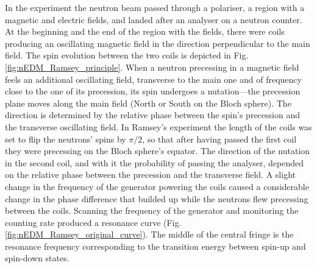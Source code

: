 In the experiment the neutron beam passed through a polariser, a region with a magnetic and electric fields, and landed after an analyser on a neutron counter. At the beginning and the end of the region with the fields, there were coils producing an oscillating magnetic field in the direction perpendicular to the main field. The spin evolution between the two coils is depicted in Fig.\,\ref{fig:nEDM_Ramsey_principle}. When a neutron precessing in a magnetic field feels an additional oscillating field, transverse to the main one and of frequency close to the one of its precession, its spin undergoes a nutation---the precession plane moves along the main field (North or South on the Bloch sphere). The direction is determined by the relative phase between the spin's precession and the transverse oscillating field. In Ramsey's experiment the length of the coils was set to flip the neutrons' spins by $\pi/2$, so that after having passed the first coil they were precessing on the Bloch sphere's equator. The direction of the nutation in the second coil, and with it the probability of passing the analyser, depended on the relative phase between the precession and the transverse field. A slight change in the frequency of the generator powering the coils caused a considerable change in the phase difference that builded up while the neutrons flew precessing between the coils. Scanning the frequency of the generator and monitoring the counting rate produced a resonance curve (Fig.\,\ref{fig:nEDM_Ramsey_original_curve}). The middle of the central fringe is the resonance frequency corresponding to the transition energy between spin-up and spin-down states.

